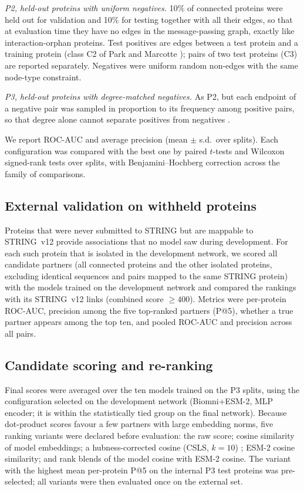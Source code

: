 \documentclass[pdflatex,sn-mathphys-num]{sn-jnl}
\begin{document}
\emph{P2, held-out proteins with uniform negatives.} 10\% of connected proteins were held out for validation and 10\% for testing together with all their edges, so that at evaluation time they have no edges in the message-passing graph, exactly like interaction-orphan proteins. Test positives are edges between a test protein and a training protein (class C2 of Park and Marcotte \cite{park2012flaw}); pairs of two test proteins (C3) are reported separately. Negatives were uniform random non-edges with the same node-type constraint.

\emph{P3, held-out proteins with degree-matched negatives.} As P2, but each endpoint of a negative pair was sampled in proportion to its frequency among positive pairs, so that degree alone cannot separate positives from negatives \cite{li2023linkpitfalls}.

We report ROC-AUC and average precision (mean $\pm$ s.d.\ over splits). Each configuration was compared with the best one by paired $t$-tests and Wilcoxon signed-rank tests over splits, with Benjamini--Hochberg correction across the family of comparisons.

\subsection{External validation on withheld proteins}\label{sec:external}
Proteins that were never submitted to STRING but are mappable to STRING~v12 provide associations that no model saw during development. For each such protein that is isolated in the development network, we scored all candidate partners (all connected proteins and the other isolated proteins, excluding identical sequences and pairs mapped to the same STRING protein) with the models trained on the development network and compared the rankings with its STRING~v12 links (combined score $\geq400$). Metrics were per-protein ROC-AUC, precision among the five top-ranked partners (P@5), whether a true partner appears among the top ten, and pooled ROC-AUC and precision across all pairs.

\subsection{Candidate scoring and re-ranking}
Final scores were averaged over the ten models trained on the P3 splits, using the configuration selected on the development network (Biomni+ESM-2, MLP encoder; it is within the statistically tied group on the final network). Because dot-product scores favour a few partners with large embedding norms, five ranking variants were declared before evaluation: the raw score; cosine similarity of model embeddings; a hubness-corrected cosine (CSLS, $k=10$) \cite{conneau2018csls}; ESM-2 cosine similarity; and rank blends of the model cosine with ESM-2 cosine. The variant with the highest mean per-protein P@5 on the internal P3 test proteins was pre-selected; all variants were then evaluated once on the external set.
\end{document}

